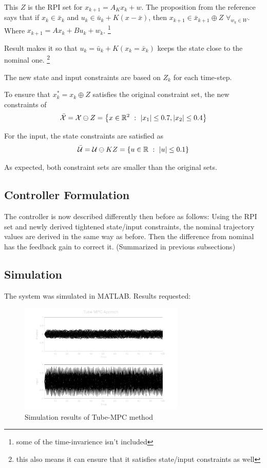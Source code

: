 \documentclass[]{article}
\newcommand{\R}{\mathbb{R}}
\newcommand{\st}{\ : \ }
\begin{document}
This $Z$ is the RPI set for $x_{k+1} = A_K x_k + w$.
The proposition from the reference says that if $x_k \in \bar{x}_k$ and $u_k \in \bar{u}_k + K(x - \bar{x})$, then $x_{k+1} \in \bar{x}_{k+1} \oplus Z$ $\forall_{w_k \in W}$.
Where $x_{k+1} = A x_{k} + B u_{k} + w_k$. 
\footnote{some of the time-invarience isn't included}

Result makes it so that $u_k = \bar{u}_k + K (x_k = \bar{x}_k)$ keeps the state close to the nominal one.
\footnote{this also means it can ensure that it satisfies state/input constraints as well}

The new state and input constraints are based on $Z_k$ for each time-step.

To ensure that $x^*_k = x_k \oplus Z$ satisfies the original constraint set, the new constraints of 
\begin{equation}
    \bar{\mathcal{X}} = \mathcal{X} \ominus Z = \qty{x \in \R^2 \st \abs{x_1} \leq 0.7, \abs{x_2} \leq 0.4}
\end{equation}

For the input, the state constraints are satisfied as 
\begin{equation}
    \bar{\mathcal{U}} = \mathcal{U} \ominus K Z = \qty{u \in \R \st \abs{u} \leq 0.1}
\end{equation}

As expected, both constraint sets are smaller than the original sets.

\subsection{Controller Formulation}
The controller is now described differently then before as follows:
Using the RPI set and newly derived tightened state/input constraints, the nominal trajectory values are derived in the same way as before.
Then the difference from nominal has the feedback gain to correct it.
(Summarized in previous subsections)

\newpage
\subsection{Simulation}
The system was simulated in MATLAB.
Results requested:
\begin{figure}[h]
    \centering
    \includegraphics[width = 0.7\textwidth]{figs/pblm2e_results.png}
    \caption{Simulation results of Tube-MPC method}
\end{figure}
\end{document}
